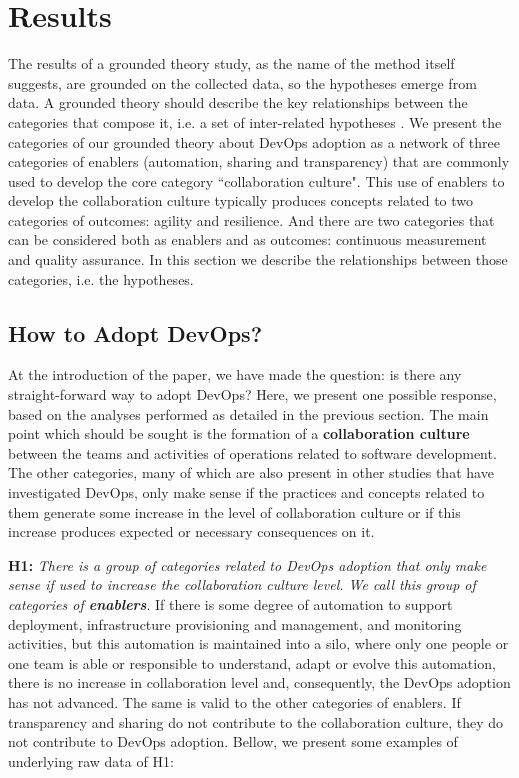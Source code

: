 \section{Results} \label{sec:results}
The results of a grounded theory study, as the name of the method itself
suggests, are grounded on the collected data, so the hypotheses emerge from
data. A grounded theory should describe the key relationships between the
categories that compose it, i.e. a set of inter-related hypotheses
\cite{hoda2017becoming}. We present the categories of our grounded theory
about DevOps adoption as a network of three categories of enablers (automation,
sharing and transparency) that are commonly used to develop the core category
``collaboration culture". This use of enablers to develop the collaboration
culture typically produces concepts related to two categories of outcomes:
agility and resilience. And there are two categories that can be considered
both as enablers and as outcomes: continuous measurement and quality assurance.
In this section we describe the relationships between those categories, i.e.
the hypotheses.

\subsection{How to Adopt DevOps?}
At the introduction of the paper, we have made the question: is there any
straight-forward way to adopt DevOps? Here, we present one possible response,
based on the analyses performed as detailed in the previous section. The main
point which should be sought is the formation of a \textbf{collaboration
culture} between the teams and activities of operations related to software
development. The other categories, many of which are also present in other
studies that have investigated DevOps, only make sense if the practices and
concepts related to them generate some increase in the level of collaboration
culture or if this increase produces expected or necessary consequences on it.

\textbf{H1:} \textit{There is a group of categories related to DevOps adoption
that only make sense if used to increase the collaboration culture level. We
call this group of categories of \textbf{enablers}}. If there is some degree of
automation to support deployment, infrastructure provisioning and management,
and monitoring activities, but this automation is maintained into a silo, where
only one people or one team is able or responsible to understand, adapt or
evolve this automation, there is no increase in collaboration level and,
consequently, the DevOps adoption has not advanced. The same is valid to the
other categories of enablers. If transparency and sharing do not contribute to
the collaboration culture, they do not contribute to DevOps adoption. Bellow,
we present some examples of underlying raw data of H1:

